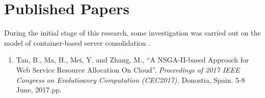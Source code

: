 \section{Published Papers}

During the initial stage of this research, some investigation 
was carried out on the model of container-based server consolidation \cite{Tan:2017tz}. 

\begin{enumerate}
	\item Tan, B., Ma, H., Mei, Y. and Zhang, M., ``A NSGA-II-based Approach for Web Service Resource Allocation On Cloud''. \textit{
	Proceedings of 2017 IEEE Congress on Evolutioanry Computation (CEC2017). } Donostia, Spain. 5-8 June, 2017.pp. 



\end{enumerate}

